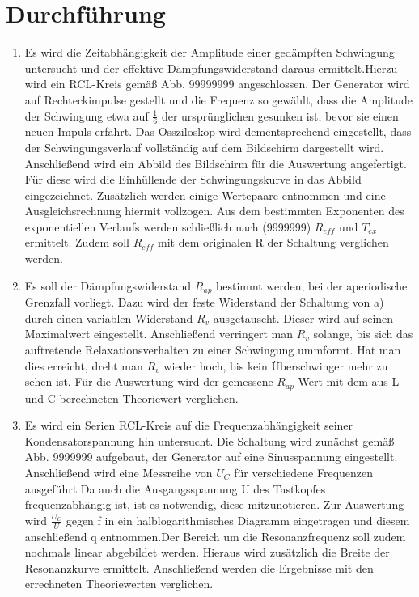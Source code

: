 \section{Durchführung}
\label{sec:Durchführung}
\renewcommand{\labelenumi}{\alph{enumi})}
\begin{enumerate}
\item Es wird die Zeitabhängigkeit der Amplitude einer gedämpften Schwingung untersucht
 und der effektive Dämpfungswiderstand daraus ermittelt.Hierzu wird ein RCL-Kreis gemäß
 Abb. 99999999 angeschlossen. Der Generator wird auf Rechteckimpulse gestellt
  und die Frequenz so gewählt, dass die Amplitude der Schwingung etwa auf $\frac{1}{6}$
   der ursprünglichen gesunken ist, bevor sie einen neuen Impuls erfährt. Das Ossziloskop
    wird dementsprechend eingestellt, dass der Schwingungsverlauf vollständig auf dem Bildschirm dargestellt wird.
    Anschließend wird ein Abbild des Bildschirm für die Auswertung angefertigt.
    Für diese wird die Einhüllende der Schwingungskurve in das Abbild eingezeichnet.
     Zusätzlich werden einige Wertepaare entnommen und eine Ausgleichsrechnung hiermit vollzogen.
     Aus dem bestimmten Exponenten des exponentiellen Verlaufs werden schließlich nach (9999999)
     $R_{eff}$ und $T_{ex}$ ermittelt. Zudem soll $R_{eff}$ mit dem originalen R der Schaltung verglichen werden.

     \item Es soll der Dämpfungswiderstand $R_{ap}$ bestimmt werden, bei der aperiodische Grenzfall vorliegt.
     Dazu wird der feste Widerstand der Schaltung von a) durch einen variablen Widerstand $R_v$
     ausgetauscht. Dieser wird auf seinen Maximalwert eingestellt. Anschließend verringert man $R_v$
     solange, bis sich das auftretende Relaxationsverhalten zu einer Schwingung ummformt.
      Hat man dies erreicht, dreht man $R_v$ wieder hoch, bis kein Überschwinger mehr zu sehen ist.
      Für die Auswertung wird der gemessene $R_{ap}$-Wert mit dem aus L und C berechneten Theoriewert verglichen.

      \item Es wird ein Serien RCL-Kreis auf die Frequenzabhängigkeit seiner Kondensatorspannung hin untersucht.
      Die Schaltung wird zunächst gemäß Abb. 9999999 aufgebaut, der Generator auf eine Sinusspannung eingestellt.
      Anschließend wird eine Messreihe von $U_C$ für verschiedene Frequenzen ausgeführt
       Da auch die Ausgangsspannung U des Tastkopfes frequenzabhängig ist, ist es notwendig, diese mitzunotieren.
       Zur Auswertung wird $\frac{U_C}{U}$ gegen f in ein halblogarithmisches Diagramm eingetragen und diesem
        anschließend q entnommen.Der Bereich um die Resonanzfrequenz soll zudem nochmals linear
         abgebildet werden. Hieraus wird zusätzlich die Breite der Resonanzkurve ermittelt.
         Anschließend werden die Ergebnisse mit den errechneten Theoriewerten verglichen.


\end{enumerate}
